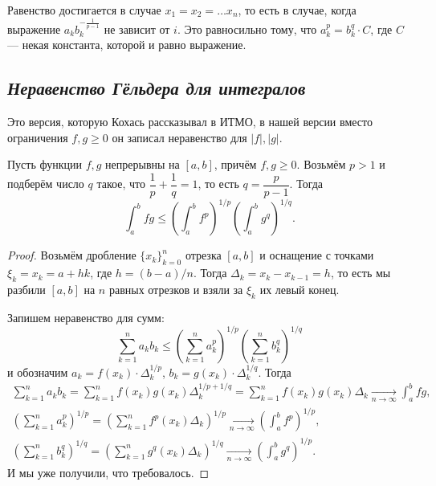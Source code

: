 \begin{remark}
	Равенство достигается в случае \(x_1 = x_2 = \ldots x_n\), то есть в случае, когда выражение \(a_k b_k^{-\frac{1}{p - 1}}\) не зависит от \(i\). Это равносильно тому, что \(a_k^p = b_k^q \cdot C\), где \(C\) --- некая константа, которой и равно выражение. 
\end{remark}

\subsection{\itshape Неравенство Гёльдера для интегралов}

\begin{remark}
	Это версия, которую Кохась рассказывал в ИТМО, в нашей версии вместо ограничения \(f, g \geqslant 0\) он записал неравенство для \(|f|, |g|\).
\end{remark}

\begin{theorem}
	Пусть функции \(f, g\) непрерывны на  \([a, b]\), причём \(f, g \geqslant 0\). Возьмём \(p > 1\) и подберём число \(q\) такое, что \(\dfrac{1}{p} + \dfrac{1}{q} = 1\), то есть \(q = \dfrac{p}{p - 1}\). Тогда \[
	\int_a^b fg \leqslant \left(\int_{a}^{b} f^p \right)^{1/p} \left(\int_{a}^{b} g^q \right)^{1/q}.
	\]
\end{theorem}
\begin{proof}
	Возьмём дробление \(\{x_k\}_{k=0}^n\) отрезка  \([a, b]\) и оснащение с точками \(\xi_k = x_k = a + hk\), где \(h = (b-a)/n\). Тогда \(\Delta_k = x_{k} - x_{k-1} = h\), то есть мы разбили \([a, b]\) на \(n\) равных отрезков и взяли за \(\xi_k\) их левый конец.
	
	Запишем неравенство для сумм:
	\begin{equation} \label{ГёльГёль}
		\sum_{k=1}^n a_k b_k \leqslant \left(\sum_{k=1}^{n} a_k^p \right)^{1/p} \left(\sum_{k=1}^{n} b_k^q \right)^{1/q}
	\end{equation}
	и обозначим \(a_k = f(x_k) \cdot \Delta_k^{1/p}\), \(b_k = g(x_k) \cdot \Delta_k^{1/q}\). Тогда
	\begin{gather*}
		\sum_{k=1}^n a_k b_k = \sum_{k=1}^n f(x_k) g(x_k) \Delta_k^{1/p + 1/q} = \sum_{k=1}^n f(x_k) g(x_k) \Delta_k \xrightarrow[n \to \infty]{} \int_a^b fg, \\
		\left(\sum_{k=1}^n a_k^p \right)^{1/p} = \left(\sum_{k=1}^n f^p(x_k) \Delta_k \right)^{1/p} \xrightarrow[n \to \infty]{} \left(\int_a^b f^p \right)^{1/p}, \\
		\left(\sum_{k=1}^n b_k^q \right)^{1/q} = \left(\sum_{k=1}^n g^q(x_k) \Delta_k \right)^{1/q} \xrightarrow[n \to \infty]{} \left(\int_a^b g^q\right)^{1/p}.
	\end{gather*}
	И мы уже получили, что требовалось.
\end{proof}

